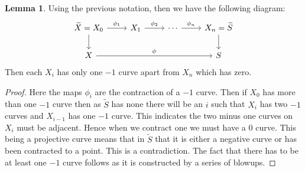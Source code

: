 \documentclass[11pt]{amsart}
\theoremstyle{definition}
\theoremstyle{definition}
\theoremstyle{definition}
\theoremstyle{definition}
\theoremstyle{definition}
\newtheorem{lem}[thm]{Lemma}
\theoremstyle{definition}
\theoremstyle{definition}
\theoremstyle{definition}
\newcommand{\wt}[1]{\widetilde{#1}}
\begin{document}
 
 
\begin{lem}\label{onecurve}
Using the previous notation, then we have the following diagram:
\[
\begin{tikzcd}
\wt{X}  = X_0 \arrow[r, "\phi_1"] \arrow[d] & X_1 \arrow[r, "\phi_2"] & \cdots \arrow[r, "\phi_n"] & X_n = \wt{S} \arrow[d] \\
X \arrow[rrr, "\phi"]                      &               &                            & S                     
\end{tikzcd}
\]
Then each $X_i$ has only one $-1$ curve apart from $X_n$ which has zero.
\end{lem}
\begin{proof}


Here the maps $\phi_i$ are the contraction of a $-1$ curve. Then if $X_0$ has more than one $-1$ curve then as $\wt{S}$ has none there will be an $i$ such that $X_i$ has two $-1$ curves and $X_{i-1}$ has one $-1$ curve. This indicates the two minus one curves on $X_i$ must be adjacent. Hence when we contract one we must have a $0$ curve. This being a projective curve means that in $\wt{S}$ that it is either a negative curve or has been contracted to a point. This is a contradiction. The fact that there has to be at least one $-1$ curve follows as it is constructed by a series of blowups.
\end{proof}
 
\end{document}
